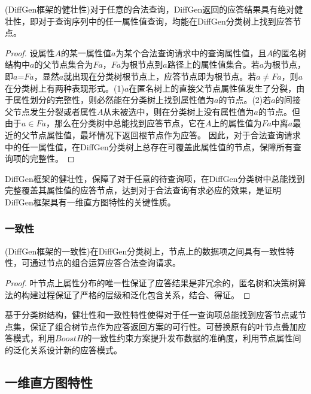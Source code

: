 \begin{prop}
	\label{chap4_prop3}
	(DiffGen框架的健壮性)对于任意的合法查询，DiffGen返回的应答结果具有绝对健壮性，即对于查询序列中的任一属性值查询，均能在DiffGen分类树上找到应答节点。
\end{prop}
\begin{proof}
	设属性$A$的某一属性值$a$为某个合法查询请求中的查询属性值，且$A$的匿名树结构中$a$的父节点集合为$Fa$，$Fa$为根节点到$a$路径上的属性值集合。若$a$为根节点，即$a$=$Fa$，显然$a$就出现在分类树根节点上，应答节点即为根节点。若$a$$\neq$$Fa$，则$a$在分类树上有两种表现形式。(1)$a$在匿名树上的直接父节点属性值发生了分裂，由于\label{chap4_prop2}属性划分的完整性，则必然能在分类树上找到属性值为$a$的节点。(2)若$a$的间接父节点发生分裂或者属性$A$从未被选中，则在分类树上没有属性值为$a$的节点。但由于$a$$\in$$Fa$，那么在分类树中总能找到应答节点，它在$A$上的属性值为$Fa$中离$a$最近的父节点属性值，最坏情况下返回根节点作为应答。
	因此，对于合法查询请求中的任一属性值，在DiffGen分类树上总存在可覆盖此属性值的节点，保障所有查询项的完整性。
\end{proof}

DiffGen框架的健壮性，保障了对于任意的待查询项，在DiffGen分类树中总能找到完整覆盖其属性值的应答节点，达到对于合法查询有求必应的效果，是证明DiffGen框架具有一维直方图特性的关键性质。

\subsubsection{一致性}

\begin{prop}
	\label{chap4_prop4}
	(DiffGen框架的一致性)在DiffGen分类树上，节点上的数据项之间具有一致性特性，可通过节点的组合运算应答合法查询请求。
\end{prop}
\begin{proof}
	叶节点上属性分布的唯一性保证了应答结果是非冗余的，匿名树和决策树算法的构建过程保证了严格的层级和泛化包含关系，结合\label{chap4_prop2}、\label{chap4_prop3}得证。
\end{proof}

基于分类树结构，健壮性和一致性特性使得对于任一查询项总能找到应答节点或节点集，保证了组合树节点作为应答返回方案的可行性。可替换原有的叶节点叠加应答模式，利用$BoostH$的一致性约束方案提升发布数据的准确度，利用节点属性间的泛化关系设计新的应答模式。


\subsection{一维直方图特性} %


